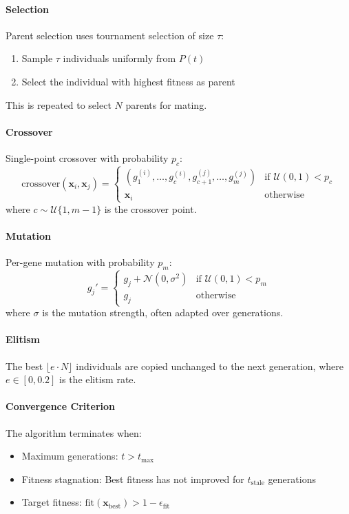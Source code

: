 \paragraph{Selection}
Parent selection uses tournament selection of size $\tau$:
\begin{enumerate}
\item Sample $\tau$ individuals uniformly from $P(t)$
\item Select the individual with highest fitness as parent
\end{enumerate}
This is repeated to select $N$ parents for mating.

\paragraph{Crossover}
Single-point crossover with probability $p_c$:
\begin{equation}
\text{crossover}(\mathbf{x}_i, \mathbf{x}_j) = \begin{cases}
(g_1^{(i)}, \ldots, g_c^{(i)}, g_{c+1}^{(j)}, \ldots, g_m^{(j)}) & \text{if } \mathcal{U}(0,1) < p_c \\
\mathbf{x}_i & \text{otherwise}
\end{cases}
\end{equation}
where $c \sim \mathcal{U}\{1, m-1\}$ is the crossover point.

\paragraph{Mutation}
Per-gene mutation with probability $p_m$:
\begin{equation}
g_j' = \begin{cases}
g_j + \mathcal{N}(0, \sigma^2) & \text{if } \mathcal{U}(0,1) < p_m \\
g_j & \text{otherwise}
\end{cases}
\end{equation}
where $\sigma$ is the mutation strength, often adapted over generations.

\paragraph{Elitism}
The best $\lfloor e \cdot N \rfloor$ individuals are copied unchanged to the next generation, where $e \in [0, 0.2]$ is the elitism rate.

\paragraph{Convergence Criterion}
The algorithm terminates when:
\begin{itemize}
\item Maximum generations: $t > t_{\max}$
\item Fitness stagnation: Best fitness has not improved for $t_{\text{stale}}$ generations
\item Target fitness: $\text{fit}(\mathbf{x}_{\text{best}}) > 1 - \epsilon_{\text{fit}}$
\end{itemize}

